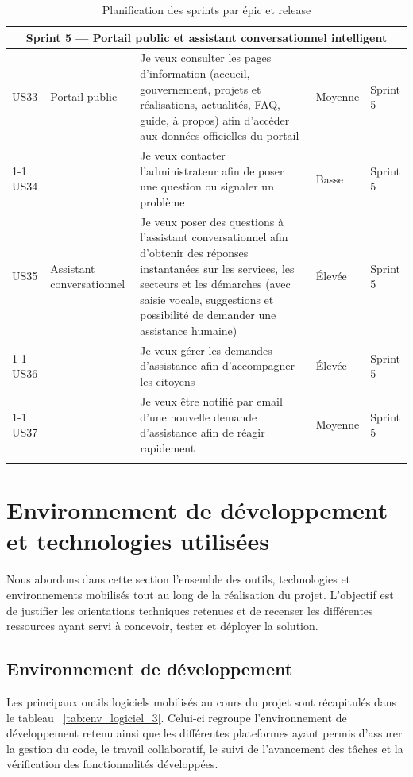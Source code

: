 \begin{longtable}{|p{0.8cm}|p{2.5cm}|p{6.2cm}|p{1.5cm}|p{1.5cm}|}
\multicolumn{5}{|c|}{\cellcolor{orange!15}\textbf{Sprint 5 — Portail public et 
assistant conversationnel intelligent}} \\ \hline

US33 & Portail public
     & Je veux consulter les pages d'information (accueil, gouvernement, projets et réalisations, actualités, FAQ, guide, à propos) afin d'accéder aux données officielles du portail & Moyenne & Sprint 5 \\ \cline{1-1}\cline{3-5}
US34 & & Je veux contacter l'administrateur afin de poser une question ou signaler un problème & Basse & Sprint 5 \\ \hline

US35 & Assistant conversationnel
     & Je veux poser des questions à l'assistant conversationnel afin d'obtenir des réponses instantanées sur les services, les secteurs et les démarches (avec saisie vocale, suggestions et possibilité de demander une assistance humaine) & Élevée & Sprint 5 \\ \cline{1-1}\cline{3-5}
US36 & & Je veux gérer les demandes d'assistance afin d'accompagner les citoyens & Élevée & Sprint 5 \\ \cline{1-1}\cline{3-5}
US37 & & Je veux être notifié par email d'une nouvelle demande d'assistance afin de réagir rapidement & Moyenne & Sprint 5 \\ \hline

\caption{Planification des sprints par épic et release}
\label{tab:planification_sprints}
\end{longtable}


\section{Environnement de développement et technologies utilisées}

Nous abordons dans cette section l'ensemble des outils, technologies et environnements mobilisés tout au long de la réalisation du projet. L'objectif est de justifier les orientations techniques retenues et de recenser les différentes ressources ayant servi à concevoir, tester et déployer la solution.

 

\subsection{Environnement de développement}

Les principaux outils logiciels mobilisés au cours du projet sont récapitulés dans le tableau ~\ref{tab:env_logiciel_3}. Celui-ci regroupe l'environnement de développement retenu ainsi que les différentes plateformes ayant permis d'assurer la gestion du code, le travail collaboratif, le suivi de l'avancement des tâches et la vérification des fonctionnalités développées.

